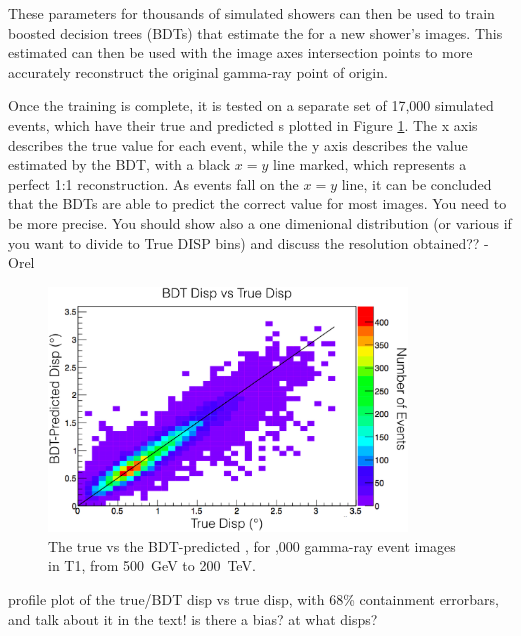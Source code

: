     These parameters for thousands of simulated showers can then be used to train boosted decision trees (BDTs) that estimate the \disp{} for a new shower's images.
    This estimated \disp{} can then be used with the image axes intersection points to more accurately reconstruct the original gamma-ray point of origin.
    
    Once the training is complete, it is tested on a separate set of 17,000 simulated events, which have their true and predicted \disp{}s plotted in Figure \ref{fig:disptraining}.
    The x axis describes the true \disp{} value for each event, while the y axis describes the \disp{} value estimated by the BDT, with a black $x=y$ line marked, which represents a perfect 1:1 \disp{} reconstruction.
    As events fall on the $x=y$ line, it can be concluded that the BDTs are able to predict the correct \disp{} value for most images.
    {\color{red} You need to be more precise.  You should show also a one dimenional distribution (or various if you want to divide to True DISP bins) and discuss the resolution obtained?? -Orel}

    \begin{figure}[ht]
      \centering
      \includegraphics[width=0.85\textwidth]{images/disp_training.eps}
      \caption[Disp BDT Training]{
        The true \disp{} vs the BDT-predicted \disp{}, for ,000 gamma-ray event images in T1, from \SI{500}{\GeV} to \SI{200}{\TeV}.
      }
      \label{fig:disptraining}
    \end{figure}
    
    {\color{red} profile plot of the true/BDT disp vs true disp, with 68\% containment errorbars, and talk about it in the text! is there a bias? at what disps? }

